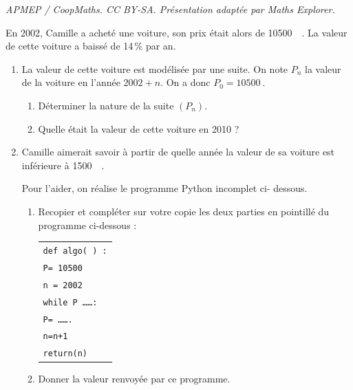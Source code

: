 \documentclass[10pt]{article}
\providecommand{\euro}{\texteuro}
\providecommand{\np}[2][]{{#2~#1}}
\providecommand{\euro}{{\text{€}}}
\renewcommand{\euro}{\ifmmode\text{\texteuro}\else\texteuro\fi}
\begin{document}
\noindent\textit{APMEP / CoopMaths. CC BY-SA. Présentation adaptée par Maths Explorer.}\par\medskip
\medskip

En 2002, Camille a acheté une voiture, son prix était alors de \np{10500}~\euro. La valeur de cette voiture a baissé de 14\,\% par an.

\medskip

\begin{enumerate}
\item La valeur de cette voiture est modélisée par une suite. On note $P_n$ la valeur de la voiture en l'année $2002+ n$. On a donc $P_0 = \np{10500}$.
	\begin{enumerate}
		\item Déterminer la nature de la suite $\left(P_n\right)$.
		\item Quelle était la valeur de cette voiture en 2010 ?
	\end{enumerate}
\item Camille aimerait savoir à partir de quelle année la valeur de sa voiture est inférieure à \np{1500}~\euro. 

Pour l'aider, on réalise le programme Python incomplet ci- dessous.

	\begin{enumerate}
		\item Recopier et compléter sur votre copie les deux parties en pointillé du programme ci-dessous :

\begin{center}
\begin{tabular}{|l|}\hline
\texttt{def algo( ) :}\\
\quad \texttt{P= \np{10500}}\\
\quad \texttt{n = 2002}\\
\quad \texttt{while P \ldots \ldots:}\\
\qquad \texttt{P= \ldots \ldots.}\\
\qquad \texttt{n=n+1} \\
\quad \texttt{return(n)}\\ \hline
\end{tabular}
\end{center}

		\item Donner la valeur renvoyée par ce programme.
	\end{enumerate}
\end{enumerate}

\bigskip
\end{document}
